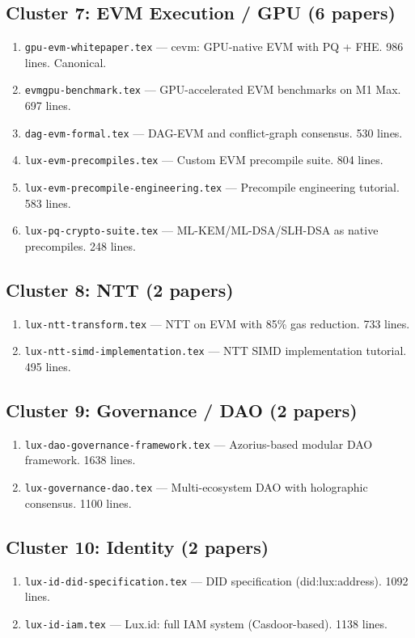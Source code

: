 \documentclass[11pt,a4paper]{article}
\begin{document}
\subsection{Cluster 7: EVM Execution / GPU (6 papers)}
\begin{enumerate}[leftmargin=2em]
\item \texttt{gpu-evm-whitepaper.tex} --- cevm: GPU-native EVM with PQ + FHE. 986 lines. Canonical.
\item \texttt{evmgpu-benchmark.tex} --- GPU-accelerated EVM benchmarks on M1 Max. 697 lines.
\item \texttt{dag-evm-formal.tex} --- DAG-EVM and conflict-graph consensus. 530 lines.
\item \texttt{lux-evm-precompiles.tex} --- Custom EVM precompile suite. 804 lines.
\item \texttt{lux-evm-precompile-engineering.tex} --- Precompile engineering tutorial. 583 lines.
\item \texttt{lux-pq-crypto-suite.tex} --- ML-KEM/ML-DSA/SLH-DSA as native precompiles. 248 lines.
\end{enumerate}

\subsection{Cluster 8: NTT (2 papers)}
\begin{enumerate}[leftmargin=2em]
\item \texttt{lux-ntt-transform.tex} --- NTT on EVM with 85\% gas reduction. 733 lines.
\item \texttt{lux-ntt-simd-implementation.tex} --- NTT SIMD implementation tutorial. 495 lines.
\end{enumerate}

\subsection{Cluster 9: Governance / DAO (2 papers)}
\begin{enumerate}[leftmargin=2em]
\item \texttt{lux-dao-governance-framework.tex} --- Azorius-based modular DAO framework. 1638 lines.
\item \texttt{lux-governance-dao.tex} --- Multi-ecosystem DAO with holographic consensus. 1100 lines.
\end{enumerate}

\subsection{Cluster 10: Identity (2 papers)}
\begin{enumerate}[leftmargin=2em]
\item \texttt{lux-id-did-specification.tex} --- DID specification (did:lux:address). 1092 lines.
\item \texttt{lux-id-iam.tex} --- Lux.id: full IAM system (Casdoor-based). 1138 lines.
\end{enumerate}
\end{document}
